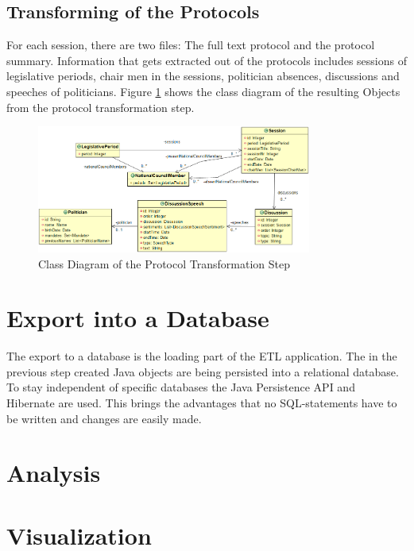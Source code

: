 \subsection{Transforming of the Protocols}
For each session, there are two files: The full text protocol and the protocol summary. Information that gets extracted out of the protocols includes sessions of legislative periods, chair men in the sessions, politician absences, discussions and speeches of politicians. Figure \ref{fig:session_class_diagram} shows the class diagram of the resulting Objects from the protocol transformation step.

\begin{figure}
	\centering
	\includegraphics[width=341px]{imgs/session_class_diagram}
	\caption{Class Diagram of the Protocol Transformation Step}
	\label{fig:session_class_diagram}
\end{figure}


\section{Export into a Database}
\label{sec:export_db}
The export to a database is the loading part of the ETL application. The in the previous step created Java objects are being persisted into a relational database. To stay independent of specific databases the Java Persistence API and Hibernate are used. This brings the advantages that no SQL-statements have to be written and changes are easily made.

\section{Analysis}
\label{sec:analysis}

\section{Visualization}
\label{sec:visualization}

